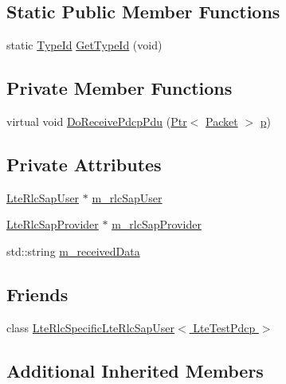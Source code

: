 \subsection*{Static Public Member Functions}
\begin{DoxyCompactItemize}
\item 
static \hyperlink{classns3_1_1TypeId}{Type\+Id} \hyperlink{classns3_1_1LteTestPdcp_ad7465efbc089b3155c7ebe90366f4466}{Get\+Type\+Id} (void)
\end{DoxyCompactItemize}
\subsection*{Private Member Functions}
\begin{DoxyCompactItemize}
\item 
virtual void \hyperlink{classns3_1_1LteTestPdcp_a63d55286c5189b16431448630d07e704}{Do\+Receive\+Pdcp\+Pdu} (\hyperlink{classns3_1_1Ptr}{Ptr}$<$ \hyperlink{classns3_1_1Packet}{Packet} $>$ \hyperlink{lte__link__budget__x2__handover__measures_8m_ac9de518908a968428863f829398a4e62}{p})
\end{DoxyCompactItemize}
\subsection*{Private Attributes}
\begin{DoxyCompactItemize}
\item 
\hyperlink{classns3_1_1LteRlcSapUser}{Lte\+Rlc\+Sap\+User} $\ast$ \hyperlink{classns3_1_1LteTestPdcp_a76903da159d3fa267cb9c06c112190a7}{m\+\_\+rlc\+Sap\+User}
\item 
\hyperlink{classns3_1_1LteRlcSapProvider}{Lte\+Rlc\+Sap\+Provider} $\ast$ \hyperlink{classns3_1_1LteTestPdcp_a3843ec2ea15b7212ee5ae44f901a6605}{m\+\_\+rlc\+Sap\+Provider}
\item 
std\+::string \hyperlink{classns3_1_1LteTestPdcp_aed6884f57c2277e3f9d35d8590618311}{m\+\_\+received\+Data}
\end{DoxyCompactItemize}
\subsection*{Friends}
\begin{DoxyCompactItemize}
\item 
class \hyperlink{classns3_1_1LteTestPdcp_a156aa6129686f4d2f50e7406b7cec4a5}{Lte\+Rlc\+Specific\+Lte\+Rlc\+Sap\+User$<$ Lte\+Test\+Pdcp $>$}
\end{DoxyCompactItemize}
\subsection*{Additional Inherited Members}


